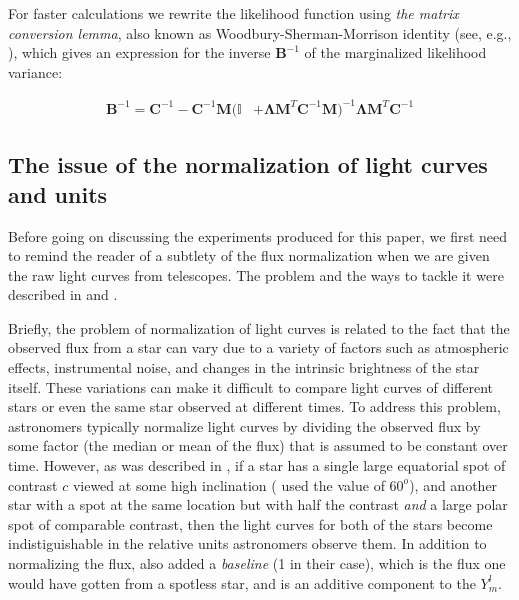 \documentclass[twocolumn]{aastex631}
\begin{document}
For faster calculations we rewrite the likelihood function using \emph{the matrix conversion lemma}, also known as 
Woodbury-Sherman-Morrison identity (see, e.g., \cite{Hogg2020}), which gives an expression for the inverse $\pmb{B}^{-1}$ of the marginalized likelihood variance:
%
\begin{linenomath}\begin{align}
    \label{eq:Hoggtrick}
    \pmb{B}^{-1} = \pmb{C}^{-1} - \pmb{C}^{-1} \pmb{M} (\pmb{\mathbb{I}} 
    & + \pmb{\Lambda} \pmb{M}^T \pmb{C}^{-1}\pmb{M})^{-1}\pmb{\Lambda} \pmb{M}^T\pmb{C}^{-1}
\end{align}\end{linenomath}
%


\subsection{The issue of the normalization of light curves and units}
Before going on discussing the experiments produced for this paper, we first need to remind the reader of a subtlety of the flux normalization when we are given
the raw light curves from telescopes. The problem and the ways to tackle it were described in \cite{Luger2021a} and \cite{Luger2021b}. 

Briefly, the problem of normalization of light curves is related to the fact that the observed flux from a star can vary due to a variety of factors 
such as atmospheric effects, instrumental noise, and changes in the intrinsic brightness of the star itself. These variations can make it difficult 
to compare light curves of different stars or even the same star observed at different times. To address this problem, astronomers typically normalize 
light curves by dividing the observed flux by some factor (the median or mean of the flux) that is assumed to be constant over time. 
However, as was described in \cite{Luger2021a}, if a star has a single large equatorial spot of contrast $c$ viewed at some high inclination 
(\cite{Luger2021a} used the value of $60^o$), and another star with a spot at the same location but with half the contrast \emph{and} a large polar spot of 
comparable contrast, then the light curves for both of the stars become indistiguishable in the relative units astronomers observe them. In addition to normalizing 
the flux, \cite{Luger2021a} also added a \emph{baseline} (1 in their case), which is the flux one would have gotten from a spotless star, 
and is an additive component to the $Y_m^l$.
\end{document}
